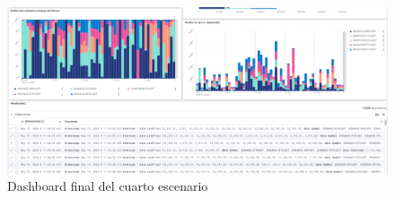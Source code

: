 \begin{figure}
    \centering
    \includegraphics[width=1\linewidth]{img/escenario4-2.png}
    \caption{Dashboard final del cuarto escenario}
    \label{fig:escenario4}
\end{figure}

\paragraph{            }
\paragraph{ }
\paragraph{ }
\paragraph{ }
\paragraph{ }
\paragraph{ }
\paragraph{ }
\paragraph{ }
\paragraph{ }
\paragraph{ }
